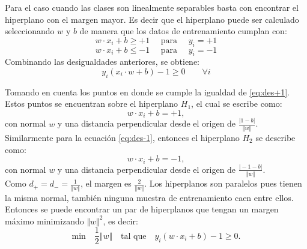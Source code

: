 Para el caso cuando las clases son linealmente separables basta con encontrar el hiperplano con el margen mayor. Es decir que el hiperplano puede ser calculado seleccionando $w$ y $b$ de manera que los datos de entrenamiento cumplan con:  
\begin{equation}\label{eq:des+1}
w \cdot x_i + b \geqslant +1 \quad \textrm{ para } \quad y_i=+1
\end{equation} 
\begin{equation}\label{eq:des-1}
w \cdot x_i + b \leqslant -1 \quad \textrm{ para } \quad y_i=-1
\end{equation} 
Combinando las desigualdades anteriores, se obtiene:  
\begin{equation}
y_i(x_i \cdot w + b) -1 \geqslant 0 \qquad \forall i 
\end{equation} 

Tomando en cuenta los puntos en donde se cumple la igualdad de \ref{eq:des+1}. Estos puntos se encuentran sobre el hiperplano $H_1$, el cual se escribe como: 
\begin{equation}\label{eq:eq+1}
w \cdot x_i + b = +1,  
\end{equation} 
con normal $w$ y una distancia perpendicular desde el origen de $\frac{\vert 1-b \vert}{ \Vert w \Vert}$. 
Similarmente para la ecuación \ref{eq:des-1}, entonces el hiperplano $H_2$ se describe como: 
\begin{equation}\label{eq:eq+1}
w \cdot x_i + b = -1,  
\end{equation} 
con normal $w$ y una distancia perpendicular desde el origen de $\frac{\vert-1-b\vert}{ \Vert w \Vert}$.\\ 
Como $d_+ = d_- = \frac{1}{\Vert w \Vert}$, el margen es $\frac{2}{\Vert w \Vert}$. Los hiperplanos son paralelos pues tienen la misma normal, también ninguna muestra de entrenamiento caen entre ellos. Entonces se puede encontrar un par de hiperplanos  que tengan un margen máximo minimizando $\Vert w \Vert^2$, es decir:  
\begin{equation}
\text{min} \quad \frac{1}{2} \Vert w \Vert \quad \text{tal que} \quad y_i(w \cdot x_i + b) -1 \geq 0.
\end{equation}  




\newpage
